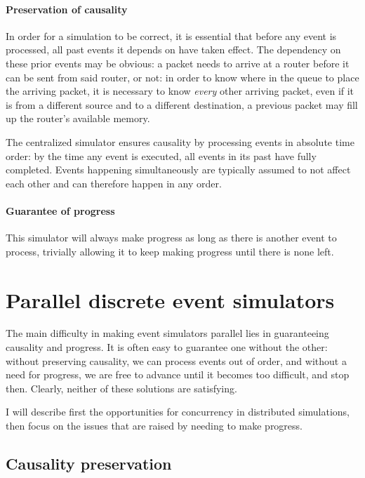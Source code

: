 \paragraph{Preservation of causality}

In order for a simulation to be correct, it is essential that before any event is processed, all past events it depends on have taken effect.
The dependency on these prior events may be obvious: a packet needs to arrive at a router before it can be sent from said router, or not: in order to know where in the queue to place the arriving packet, it is necessary to know \emph{every} other arriving packet, even if it is from a different source and to a different destination, a previous packet may fill up the router's available memory.

The centralized simulator ensures causality by processing events in absolute time order: by the time any event is executed, all events in its past have fully completed.
Events happening simultaneously are typically assumed to not affect each other and can therefore happen in any order.

\paragraph{Guarantee of progress}
This simulator will always make progress as long as there is another event to process, trivially allowing it to keep making progress until there is none left.



\section{Parallel discrete event simulators} \label{pdes}

The main difficulty in making event simulators parallel lies in guaranteeing causality and progress. 
It is often easy to guarantee one without the other: without preserving causality, we can process events out of order, and without a need for progress, we are free to advance until it becomes too difficult, and stop then.
Clearly, neither of these solutions are satisfying.

I will describe first the opportunities for concurrency in distributed simulations, then focus on the issues that are raised by needing to make progress.

\subsection{Causality preservation} \label{causality}

